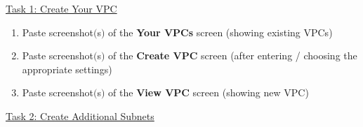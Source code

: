 \documentclass[11pt]{article}
\begin{document}
\vspace{1.5cm}

\noindent\underline{Task 1: Create Your VPC}

\begin{enumerate}
    \item Paste screenshot$($s$)$ of the \textbf{Your VPCs} screen (showing existing VPCs) \\
    \vspace{5mm}
    
    \item Paste screenshot$($s$)$ of the \textbf{Create VPC} screen (after entering / choosing the appropriate settings) \\
    \vspace{5mm}
    
    \item Paste screenshot$($s$)$ of the \textbf{View VPC} screen (showing new VPC) \\
    \vspace{5mm}
\end{enumerate}


\vspace{1cm}

\noindent\underline{Task 2: Create Additional Subnets}
\end{document}

